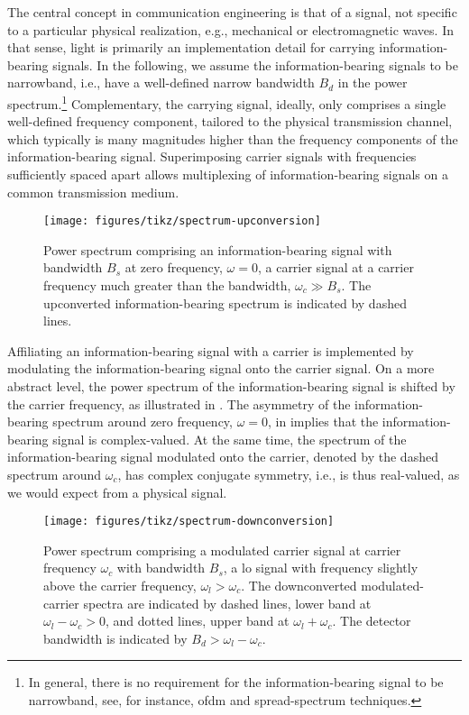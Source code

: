 The central concept in communication engineering is that of a signal, not specific to a particular physical realization, e.g., mechanical or electromagnetic waves.
In that sense, light is primarily an implementation detail for carrying information-bearing signals.
In the following, we assume the information-bearing signals to be narrowband, i.e., have a well-defined narrow bandwidth $B_d$ in the power spectrum.\footnote{In general, there is no requirement for the information-bearing signal to be narrowband, see, for instance, \gls{ofdm} and spread-spectrum techniques.}
Complementary, the carrying signal, ideally, only comprises a single well-defined frequency component, tailored to the physical transmission channel, which typically is many magnitudes higher than the frequency components of the information-bearing signal.
Superimposing carrier signals with frequencies sufficiently spaced apart allows multiplexing of information-bearing signals on a common transmission medium.
\begin{figure}[ht]
	\centering
	\texttt{[image: figures/tikz/spectrum-upconversion]}
	\caption{Power spectrum comprising an information-bearing signal with bandwidth $B_s$ at zero frequency, $\omega=0$, a carrier signal at a carrier frequency much greater than the bandwidth, $\omega_c\gg B_s$. The upconverted information-bearing spectrum is indicated by dashed lines.}\label{fig:spectrum_upconversion}
\end{figure}
Affiliating an information-bearing signal with a carrier is implemented by modulating the information-bearing signal onto the carrier signal.
On a more abstract level, the power spectrum of the information-bearing signal is shifted by the carrier frequency, as illustrated in .
The asymmetry of the information-bearing spectrum around zero frequency, $\omega=0$, in  implies that the information-bearing signal is complex-valued.
At the same time, the spectrum of the information-bearing signal modulated onto the carrier, denoted by the dashed spectrum around $\omega_c$, has complex conjugate symmetry, i.e., is thus real-valued, as we would expect from a physical signal.
\begin{figure}[ht]
	\centering
	\texttt{[image: figures/tikz/spectrum-downconversion]}
	\caption{Power spectrum comprising a modulated carrier signal at carrier frequency $\omega_c$ with bandwidth $B_s$, a \gls{lo} signal with frequency slightly above the carrier frequency, $\omega_l>\omega_c$. The downconverted modulated-carrier spectra are indicated by dashed lines, lower band at $\omega_l-\omega_c>0$, and dotted lines, upper band at $\omega_l+\omega_c$. The detector bandwidth is indicated by $B_d>\omega_l-\omega_c$.}\label{fig:spectrum_downconversion}
\end{figure}
